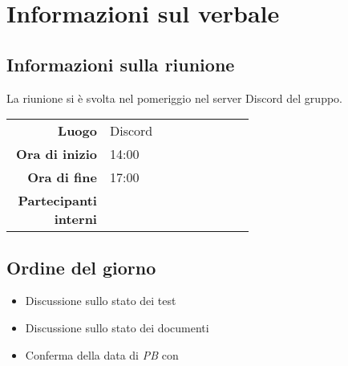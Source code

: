 \section{Informazioni sul verbale}

\subsection{Informazioni sulla riunione}
La riunione si è svolta nel pomeriggio nel server Discord del gruppo.

\begin{center}
	\begin{tabular}{r|p{0.6\linewidth}}
		\toprule
		\textbf{Luogo} & Discord \\
		\textbf{Ora di inizio} & 14:00 \\
		\textbf{Ora di fine} & 17:00 \\
		\textbf{Partecipanti interni} & \groupTeam
	\end{tabular}
\end{center}

\medskip

\subsection{Ordine del giorno}
\begin{itemize}
	\item Discussione sullo stato dei test
	\item Discussione sullo stato dei documenti
	\item Conferma della data di \textit{PB} con \cardin
\end{itemize}